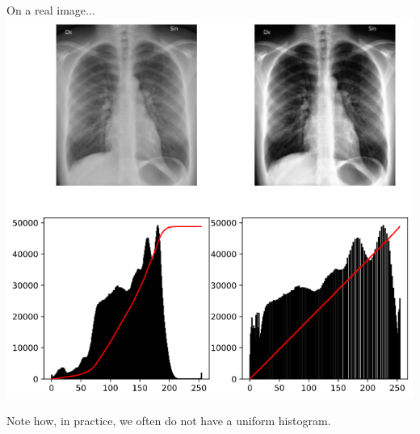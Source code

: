 \documentclass[9pt, aspectratio=169]{beamer}
\begin{document}
\begin{frame}
\begin{columns}
\begin{column}{.3\textwidth}
        \end{column}
    \end{columns}
\end{frame}

\begin{frame}
    {On a real image...}
    \centering
    \includegraphics[width=.5\textwidth]{equalize_histo_example.png}

    Note how, in practice, we often do not have a uniform histogram.
\end{frame}
\end{document}
